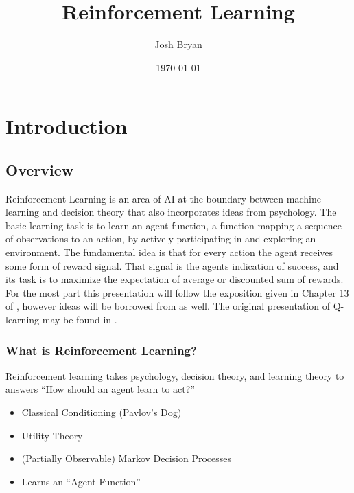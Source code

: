 \documentclass[ignorenonframetext]{beamer}
\title{Reinforcement Learning}
\author{Josh Bryan}
\institute{University of Illinois at Chicago, MCS 548}
\date{\today}
\begin{document}
\maketitle

\section{Introduction}


\subsection{Overview}

	Reinforcement Learning is an area of AI at the boundary between machine
	learning and decision theory that also incorporates ideas from
	psychology.  The basic learning task is to learn an agent function,
	a function mapping a sequence of observations to an action, by
	actively participating in and exploring an environment.  The
	fundamental idea is that for every action the agent receives some form of
	reward signal.  That signal is the agents indication of success, and
	its task is to maximize the expectation of average or discounted sum
	of rewards.  For the most part this presentation will follow 
	the exposition given in Chapter 13 of \cite{mitchell_machine_1997},
	however ideas will be borrowed from
	\cite{kaelbling_reinforcement_1996, russell_artificial_2010} as well.  The original presentation
	of Q-learning may be found in \cite{watkins_learning_1989}. 

\begin{frame}
	\frametitle{What is Reinforcement Learning?}
	\begin{block}{}
		Reinforcement learning takes psychology, decision theory, and
		learning theory to answers ``How should an agent learn to act?''
	\end{block}
	\begin{itemize}
		\item Classical Conditioning (Pavlov's Dog)
		\item Utility Theory
		\item (Partially Observable) Markov Decision Processes
		\item Learns an ``Agent Function''
	\end{itemize}
\end{frame}
\end{document}
